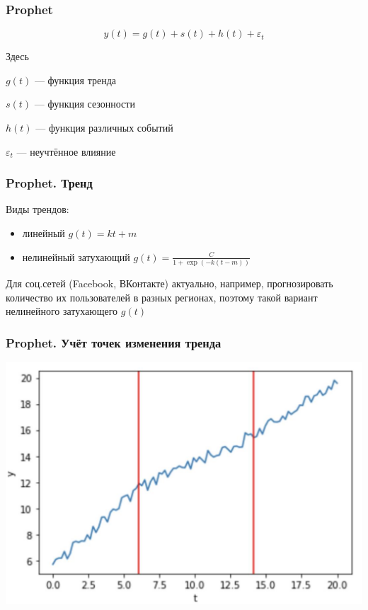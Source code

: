 \documentclass[fullscreen=true, bookmarks=true, hyperref={pdfencoding=unicode}]{beamer}
\begin{document}
\begin{frame}
  \frametitle{Prophet}

  $$ y(t) = g(t) + s(t) + h(t) + \varepsilon_t $$

  Здесь

  $g(t)$ — функция тренда

  $s(t)$ — функция сезонности

  $h(t)$ — функция различных событий

  $\varepsilon_t$ — неучтённое влияние
\end{frame}


\begin{frame}
  \frametitle{Prophet. Тренд}

  Виды трендов:
  \begin{itemize}
    \item линейный $g(t) = kt + m$
    \item нелинейный затухающий $g(t) = \frac{C}{1 + \exp(-k(t-m))}$
  \end{itemize}

  \vspace{1cm}
  Для соц.сетей (Facebook, ВКонтакте) актуально, например, прогнозировать количество их пользователей в разных регионах, поэтому такой вариант нелинейного затухающего $g(t)$
\end{frame}


\begin{frame}
  \frametitle{Prophet. Учёт точек изменения тренда}

  \begin{center}
    \includegraphics[keepaspectratio,
                   width=.6\paperwidth]{trend_change.jpg}
  \end{center}
\end{frame}
\end{document}
